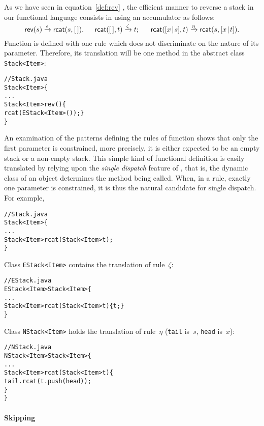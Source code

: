 As we have seen in equation~\eqref{def:rev} , the
efficient manner to reverse a stack in our functional language
consists in using an accumulator as follows:
\begin{equation*}
\textsf{rev}(s) \xrightarrow{\smash{\epsilon}}
             \textsf{rcat}(s,[\,]).\quad\;\;
\textsf{rcat}([\,],t) \xrightarrow{\smash{\zeta}} t;\quad\;\;
\textsf{rcat}([{x}\!\mid\!{s}],t) \xrightarrow{\smash{\eta}}
                          \textsf{rcat}(s,[{x}\!\mid\!{t}]).
\end{equation*}
Function  is defined with one rule which does not
discriminate on the nature of its parameter. Therefore, its
translation will be one method in the abstract class
\texttt{Stack<Item>}:
\begin{alltt}
// Stack.java
\public \abstractX \class Stack<Item> \{
  ...
  \public Stack<Item> rev() \{
    \return rcat(\new EStack<Item>()); \}
\}
\end{alltt}
An examination of the patterns defining the rules of function
 shows that only the first parameter is constrained, more
precisely, it is either expected to be an empty stack or a
non\hyp{}empty stack. This simple kind of functional definition is
easily translated by relying upon the \emph{single dispatch} feature
of \Java, that is, the dynamic class of an object determines the
method being called. When, in a rule, exactly one parameter is
constrained, it is thus the natural candidate for single dispatch. For
example,
\begin{alltt}
// Stack.java
\public \abstractX \class Stack<Item> \{
  ...
  \public \abstractX Stack<Item> rcat(\final Stack<Item> t);
\}
\end{alltt}
Class \texttt{EStack<Item>} contains the translation of rule~\(\zeta\):
\begin{alltt}
// EStack.java
\public \final \class EStack<Item> \extends Stack<Item> \{
  ...
  \public Stack<Item> rcat(\final Stack<Item> t) \{ \return t; \}
\}
\end{alltt}
Class \texttt{NStack<Item>} holds the translation of rule~\(\eta\)
(\texttt{tail} is~\(s\), \texttt{head} is~\(x\)):
\begin{alltt}
// NStack.java
\public \final \class NStack<Item> \extends Stack<Item> \{
  ...
  \public Stack<Item> rcat(\final Stack<Item> t) \{
    \return tail.rcat(t.push(head));
  \}
\}
\end{alltt}

\paragraph{Skipping}

